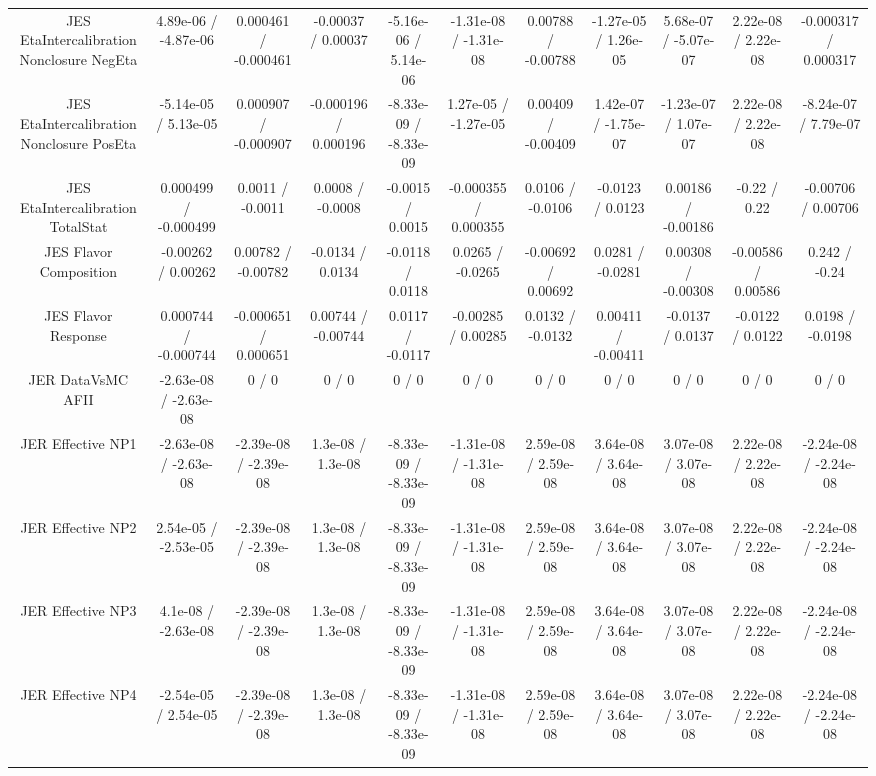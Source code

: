 \begin{table}[htbp]
\begin{center}
\begin{tabular}{|c|c|c|c|c|c|c|c|c|c|c|}
  JES EtaIntercalibration Nonclosure NegEta & 4.89e-06 / -4.87e-06 & 0.000461 / -0.000461 & -0.00037 / 0.00037 & -5.16e-06 / 5.14e-06 & -1.31e-08 / -1.31e-08 & 0.00788 / -0.00788 & -1.27e-05 / 1.26e-05 & 5.68e-07 / -5.07e-07 & 2.22e-08 / 2.22e-08 & -0.000317 / 0.000317 \\ 
  JES EtaIntercalibration Nonclosure PosEta & -5.14e-05 / 5.13e-05 & 0.000907 / -0.000907 & -0.000196 / 0.000196 & -8.33e-09 / -8.33e-09 & 1.27e-05 / -1.27e-05 & 0.00409 / -0.00409 & 1.42e-07 / -1.75e-07 & -1.23e-07 / 1.07e-07 & 2.22e-08 / 2.22e-08 & -8.24e-07 / 7.79e-07 \\ 
  JES EtaIntercalibration TotalStat & 0.000499 / -0.000499 & 0.0011 / -0.0011 & 0.0008 / -0.0008 & -0.0015 / 0.0015 & -0.000355 / 0.000355 & 0.0106 / -0.0106 & -0.0123 / 0.0123 & 0.00186 / -0.00186 & -0.22 / 0.22 & -0.00706 / 0.00706 \\ 
  JES Flavor Composition & -0.00262 / 0.00262 & 0.00782 / -0.00782 & -0.0134 / 0.0134 & -0.0118 / 0.0118 & 0.0265 / -0.0265 & -0.00692 / 0.00692 & 0.0281 / -0.0281 & 0.00308 / -0.00308 & -0.00586 / 0.00586 & 0.242 / -0.24 \\ 
  JES Flavor Response & 0.000744 / -0.000744 & -0.000651 / 0.000651 & 0.00744 / -0.00744 & 0.0117 / -0.0117 & -0.00285 / 0.00285 & 0.0132 / -0.0132 & 0.00411 / -0.00411 & -0.0137 / 0.0137 & -0.0122 / 0.0122 & 0.0198 / -0.0198 \\ 
  JER DataVsMC AFII & -2.63e-08 / -2.63e-08 & 0 / 0 & 0 / 0 & 0 / 0 & 0 / 0 & 0 / 0 & 0 / 0 & 0 / 0 & 0 / 0 & 0 / 0 \\ 
  JER Effective NP1 & -2.63e-08 / -2.63e-08 & -2.39e-08 / -2.39e-08 & 1.3e-08 / 1.3e-08 & -8.33e-09 / -8.33e-09 & -1.31e-08 / -1.31e-08 & 2.59e-08 / 2.59e-08 & 3.64e-08 / 3.64e-08 & 3.07e-08 / 3.07e-08 & 2.22e-08 / 2.22e-08 & -2.24e-08 / -2.24e-08 \\ 
  JER Effective NP2 & 2.54e-05 / -2.53e-05 & -2.39e-08 / -2.39e-08 & 1.3e-08 / 1.3e-08 & -8.33e-09 / -8.33e-09 & -1.31e-08 / -1.31e-08 & 2.59e-08 / 2.59e-08 & 3.64e-08 / 3.64e-08 & 3.07e-08 / 3.07e-08 & 2.22e-08 / 2.22e-08 & -2.24e-08 / -2.24e-08 \\ 
  JER Effective NP3 & 4.1e-08 / -2.63e-08 & -2.39e-08 / -2.39e-08 & 1.3e-08 / 1.3e-08 & -8.33e-09 / -8.33e-09 & -1.31e-08 / -1.31e-08 & 2.59e-08 / 2.59e-08 & 3.64e-08 / 3.64e-08 & 3.07e-08 / 3.07e-08 & 2.22e-08 / 2.22e-08 & -2.24e-08 / -2.24e-08 \\ 
  JER Effective NP4 & -2.54e-05 / 2.54e-05 & -2.39e-08 / -2.39e-08 & 1.3e-08 / 1.3e-08 & -8.33e-09 / -8.33e-09 & -1.31e-08 / -1.31e-08 & 2.59e-08 / 2.59e-08 & 3.64e-08 / 3.64e-08 & 3.07e-08 / 3.07e-08 & 2.22e-08 / 2.22e-08 & -2.24e-08 / -2.24e-08 \\ 

\end{tabular}
\end{center}
\end{table}
